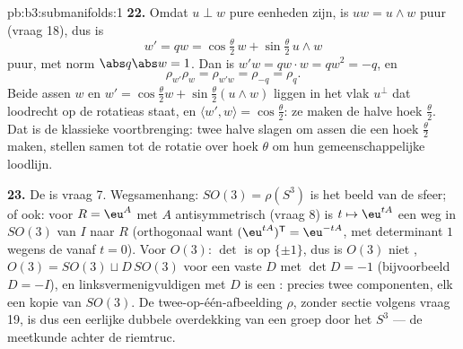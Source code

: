 \begin{solution}{pb:b3:submanifolds:1}
\textbf{22.} Omdat $u \perp w$ pure eenheden zijn, is $uw =
u\wedge w$ puur (vraag 18), dus is
\[
w' = qw = \cos\tfrac\theta2\,w + \sin\tfrac\theta2\,u\wedge
w
\]
puur, met norm $\abs q\abs w = 1$. Dan is $w'w = qw\cdot w = qw^2
= -q$, en
\[
\rho_{w'}\rho_w = \rho_{w'w} = \rho_{-q} = \rho_q .
\]
Beide assen $w$ en $w' = \cos\frac\theta2 w +
\sin\frac\theta2(u\wedge w)$ liggen in het vlak $u^\perp$ dat
loodrecht op de rotatieas staat, en $\langle w', w\rangle =
\cos\frac\theta2$: ze maken de halve hoek $\frac\theta2$. Dat is
de klassieke voortbrenging: twee halve slagen om assen die een
hoek $\frac\theta2$ maken, stellen samen tot de rotatie over hoek
$\theta$ om hun gemeenschappelijke loodlijn.

\textbf{23.} De  is vraag 7. Wegsamenhang: $SO(3) =
\rho(S^3)$ is het  beeld van de  sfeer;
of ook: voor $R = \eu^{A}$ met $A$ antisymmetrisch (vraag 8) is
$t \mapsto \eu^{tA}$ een weg in $SO(3)$ van $I$ naar $R$
(orthogonaal want $(\eu^{tA})^{\mathsf T} = \eu^{-tA}$, met
determinant $1$ wegens de  vanaf $t = 0$). Voor
$O(3)$: $\det$ is  op $\{\pm1\}$, dus is $O(3)$ niet
, $O(3) = SO(3) \sqcup D\,SO(3)$ voor een vaste $D$
met $\det D = -1$ (bijvoorbeeld $D = -I$), en
linksvermenigvuldigen met $D$ is een : precies twee
componenten, elk een kopie van $SO(3)$. De twee-op-één-afbeelding
$\rho$, zonder sectie volgens vraag 19, is dus een eerlijke
dubbele overdekking van een   groep door het
 $S^3$ --- de meetkunde achter de
riemtruc.


\end{solution}
